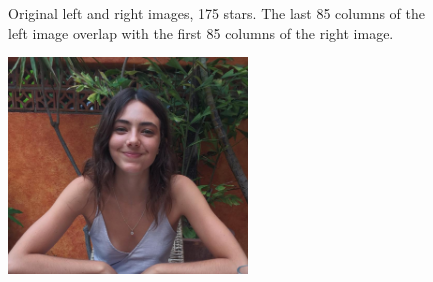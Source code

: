 \begin{enumerate}
\begin{figure}[H]
	\hspace{-0.5in}
		\hspace{-1in}
\caption [Original images, 175 stars, 33 \% overlap]{Original left and right images, 175 stars. The last 85 columns of the left image overlap with the first 85 columns of the right image.}
\label{fig:expt11}
\end{figure}
 \begin{figure}[H]
	\centering \vspace{-0.1in}
	\includegraphics[width=2.5in]{images/expt1/2.png}

\end{figure}
\end{enumerate}
